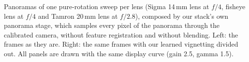 Panoramas of one pure-rotation sweep per lens (Sigma 14\,mm lens at $f/4$, fisheye lens at $f/4$ and Tamron 20\,mm lens at $f/2.8$), composed by our stack's own panorama stage, which samples every pixel of the panorama through the calibrated camera, without feature registration and without blending. Left: the frames as they are. Right: the same frames with our learned vignetting divided out. All panels are drawn with the same display curve (gain 2.5, gamma 1.5).
